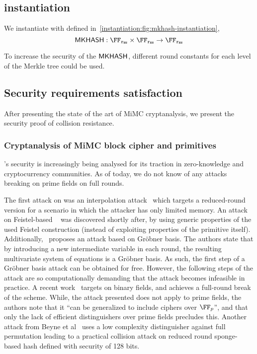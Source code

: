 \subsection{\mkhash{} instantiation}
We instantiate \mkhash{} with \mimcSevenMPPrime{} defined in~\cref{instantiation:fig:mkhash-instantiation},
\[
    \mkhash : \FFx{\rBN} \times \FFx{\rBN} \to \FFx{\rBN}
\]

\begin{remark}
    To increase the security of the $\mathsf{\mathsf{MKHASH}}$, different round constants for each level of the Merkle tree could be used.
\end{remark}

\subsection{Security requirements satisfaction}\label{instantiation:mkhash:security}
After presenting the state of the art of MiMC cryptanalysis, we present the security proof of \mimcMPPrime{} collision resistance.

\subsubsection{Cryptanalysis of MiMC block cipher and primitives}\label{instantiation:mkhash:security:cryptanalysis}
\mimc{}'s security is increasingly being analysed for its traction in zero-knowledge and cryptocurrency communities. As of today, we do not know of any attacks breaking \mimc{} on prime fields on full rounds.

The first attack on \mimc{} was an interpolation attack~\cite{li2019improved} which targets a reduced-round version for a scenario in which the attacker has only limited memory.
An attack on Feistel-based \mimc{}~\cite{bonnetain2019collisions} was discovered shortly after, by using generic properties of the used Feistel construction (instead of exploiting properties of the primitive itself).
Additionally,~\cite{albrecht2019algebraic} proposes an attack based on Gr\"{o}bner basis. The authors state that by introducing a new intermediate variable in each round, the resulting multivariate system of equations is a Gr\"{o}bner basis. As such, the first step of a Gr\"{o}bner basis attack can be obtained for free. However, the following steps of the attack are so computationally demanding that the attack becomes infeasible in practice.
A recent work~\cite{cryptoeprint:2020:182} targets \mimc{} on binary fields, and achieves a full-round break of the scheme. While, the attack presented does not apply to prime fields, the authors note that it ``can be generalized to include ciphers over $\FFx{p}$'', and that only the lack of efficient distinguishers over prime fields precludes this.
Another attack from Beyne et al~\cite{cryptoeprint:2020:188} uses a low complexity distinguisher against full \mimc{} permutation leading to a practical collision attack on reduced round sponge-based \mimc{} hash defined with security of 128 bits.

